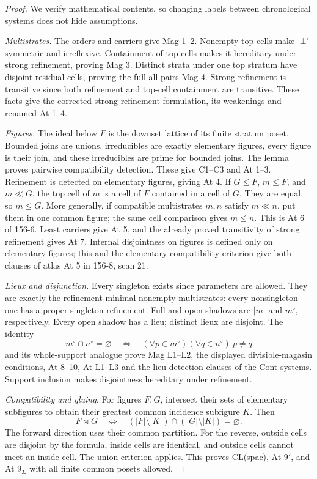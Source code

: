 \begin{proof}
We verify mathematical contents, so changing labels
between chronological systems does not hide assumptions.

\emph{Multistrates.}
The orders and carriers give Mag 1--2.
Nonempty top cells make \(\perp^\circ\) symmetric and
irreflexive. Containment of top cells makes it hereditary
under strong refinement, proving Mag 3.
Distinct strata under one top stratum have disjoint
residual cells, proving the full all-pairs Mag 4.
Strong refinement is transitive since both refinement
and top-cell containment are transitive.
These facts give the corrected strong-refinement
formulation, its weakenings and renamed At 1--4.

\emph{Figures.}
The ideal below \(F\) is the downset lattice of its
finite stratum poset. Bounded joins are unions,
irreducibles are exactly elementary figures,
every figure is their join, and these irreducibles
are prime for bounded joins. The lemma proves
pairwise compatibility detection. These give
C1--C3 and At 1--3. Refinement is detected on
elementary figures, giving At 4. If \(G\leq F\),
\(m\leq F\), and \(m\ll G\), the top cell of \(m\)
is a cell of \(F\) contained in a cell of \(G\).
They are equal, so \(m\leq G\). More generally,
if compatible multistrates \(m,n\) satisfy \(m\ll n\),
put them in one common figure; the same cell
comparison gives \(m\leq n\). This is At 6 of
156-6. Least carriers give At 5, and the already
proved transitivity of strong refinement gives
At 7. Internal disjointness on figures
is defined only on elementary figures; this and
the elementary compatibility criterion give
both clauses of atlas At 5 in 156-8, scan 21.

\emph{Lieux and disjunction.}
Every singleton exists since parameters are allowed.
They are exactly the refinement-minimal nonempty
multistrates: every nonsingleton one has a proper
singleton refinement. Full and open shadows are
\(|m|\) and \(m^\circ\), respectively.
Every open shadow has a lieu; distinct lieux
are disjoint. The identity
\[
 m^\circ\cap n^\circ=\varnothing
 \quad\Longleftrightarrow\quad
 (\forall p\in m^\circ)(\forall q\in n^\circ)\ p\ne q
\]
and its whole-support analogue prove Mag L1--L2,
the displayed divisible-magasin conditions,
At 8--10, At L1--L3 and the lieu detection
clauses of the Cont systems.
Support inclusion makes disjointness hereditary
under refinement.

\emph{Compatibility and gluing.}
For figures \(F,G\), intersect their sets of elementary
subfigures to obtain their greatest common incidence
subfigure \(K\). Then
\[
 F\bowtie G\quad\Longleftrightarrow\quad
 (|F|\setminus|K|)\cap(|G|\setminus|K|)=\varnothing.
\]
The forward direction uses their common partition.
For the reverse, outside cells are disjoint by
the formula, inside cells are identical, and
outside cells cannot meet an inside cell.
The union criterion applies. This proves
CL(spac), At \(9'\), and At \(9_\Sigma\)
with all finite common posets allowed.


\end{proof}
